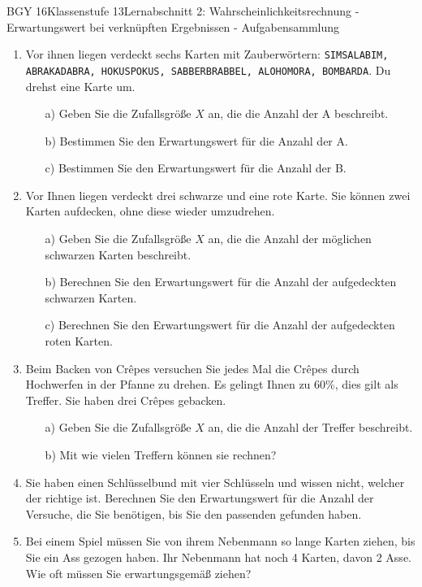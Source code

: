 \documentclass[oneside,openany,headings=optiontotoc,11pt,numbers=noenddot]{scrreprt}
\begin{document}
\begin{worksheet}{BGY 16}{Klassenstufe 13}{Lernabschnitt 2: Wahrscheinlichkeitsrechnung - Erwartungswert bei verknüpften Ergebnissen - Aufgabensammlung}
\begin{framed}
\begin{enumerate}
\begin{itemize}
				\end{itemize}
				\item Vor ihnen liegen verdeckt sechs Karten mit Zauberwörtern: \texttt{SIMSALABIM, ABRAKADABRA, HOKUSPOKUS, SABBERBRABBEL, ALOHOMORA, BOMBARDA}. Du drehst eine Karte um.
				\begin{itemize}
					\item[a)] Geben Sie die Zufallsgröße \(X\) an, die die Anzahl der \grqq{}A\grqq{} beschreibt.
					\item[b)] Bestimmen Sie den Erwartungswert für die Anzahl der \grqq{}A\grqq{}.
					\item[c)] Bestimmen Sie den Erwartungswert für die Anzahl der \grqq{}B\grqq{}.
				\end{itemize}
				\item Vor Ihnen liegen verdeckt drei schwarze und eine rote Karte. Sie können zwei Karten aufdecken, ohne diese wieder umzudrehen.
				\begin{itemize}
					\item[a)] Geben Sie die Zufallsgröße \(X\) an, die die Anzahl der möglichen schwarzen Karten beschreibt.
					\item[b)] Berechnen Sie den Erwartungswert für die Anzahl der aufgedeckten schwarzen Karten.
					\item[c)] Berechnen Sie den Erwartungswert für die Anzahl der aufgedeckten roten Karten.
				\end{itemize}
				\item Beim Backen von Crêpes versuchen Sie jedes Mal die Crêpes durch Hochwerfen in der Pfanne zu drehen. Es gelingt Ihnen zu 60\%, dies gilt als Treffer. Sie haben drei Crêpes gebacken.
				\begin{itemize}
					\item[a)] Geben Sie die Zufallsgröße \(X\) an, die die Anzahl der Treffer beschreibt.
					\item[b)] Mit wie vielen Treffern können sie rechnen?
				\end{itemize}
				\item Sie haben einen Schlüsselbund mit vier Schlüsseln und wissen nicht, welcher der richtige ist. Berechnen Sie den Erwartungswert für die Anzahl der Versuche, die Sie benötigen, bis Sie den passenden gefunden haben.
				\item Bei einem Spiel müssen Sie von ihrem Nebenmann so lange Karten ziehen, bis Sie ein Ass gezogen haben. Ihr Nebenmann hat noch 4 Karten, davon 2 Asse. Wie oft müssen Sie erwartungsgemäß ziehen?
			\end{enumerate}
		\end{framed}
	\end{worksheet}
\end{document}
